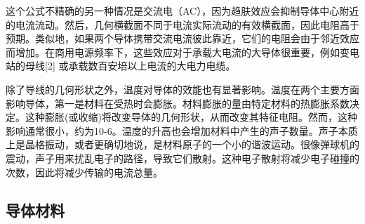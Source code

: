 这个公式不精确的另一种情况是交流电（AC），因为趋肤效应会抑制导体中心附近的电流流动。然后，几何横截面不同于电流实际流动的有效横截面，因此电阻高于预期。类似地，如果两个导体携带交流电流彼此靠近，它们的电阻会由于邻近效应而增加。在商用电源频率下，这些效应对于承载大电流的大导体很重要，例如变电站的母线[2] 或承载数百安培以上电流的大电力电缆。

除了导线的几何形状之外，温度对导体的效能也有显著影响。温度在两个主要方面影响导体，第一是材料在受热时会膨胀。材料膨胀的量由特定材料的热膨胀系数决定。这种膨胀(或收缩)将改变导体的几何形状，从而改变其特征电阻。然而，这种影响通常很小，约为10-6。温度的升高也会增加材料中产生的声子数量。声子本质上是晶格振动，或者更确切地说，是材料原子的一个小的谐波运动。很像弹球机的震动，声子用来扰乱电子的路径，导致它们散射。这种电子散射将减少电子碰撞的次数，因此将减少传输的电流总量。

\subsection{导体材料}